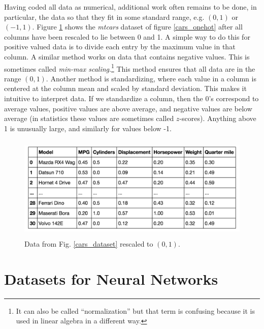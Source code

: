 Having coded all data as numerical, additional work often remains to be done, in particular,  the data so that they fit in some standard range, e.g. $(0,1)$ or $(-1,1)$. Figure \ref{cars_dataset_scaled} shows the \emph{mtcars} dataset of figure \ref{cars_onehot} after all columns have been rescaled to lie between 0 and 1. A simple way to do this for positive valued data is to divide each entry by the maximum value in that column. A similar method works on data that contains negative values. This is sometimes called \emph{min-max scaling}.\footnote{It can also be called ``normalization'' but that term is confusing because it is used in linear algebra in a  different way.} This method ensures that all data are in the range  $(0,1)$. Another method is standardizing, where each value in a column is centered at the column mean and scaled by standard deviation. This makes it intuitive to interpret data. If we standardize a column, then the 0's correspond to average values, positive values are above average, and negative values are below average (in statistics these values are sometimes called $z$-scores). Anything above 1 is unusually large, and similarly for values below -1. 

\begin{figure}[h]
\centering
\includegraphics[height=50mm]{./images/CarsScaled.png}
\caption[Screenshot of Motor Trend Car Road Tests dataset included with R.]{Data from Fig. \ref{cars_dataset} rescaled to $(0,1)$.}
\label{cars_dataset_scaled}
\end{figure}

\section{Datasets for Neural Networks}\label{datasets}

